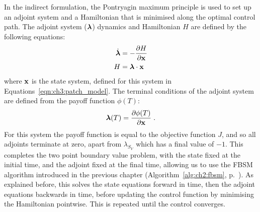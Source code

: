 In the indirect formulation, the Pontryagin maximum principle is used to set up an adjoint system and a Hamiltonian that is minimised along the optimal control path. The adjoint system ($\mathbf{\bm{\lambda}}$) dynamics and Hamiltonian $H$ are defined by the following equations:
\begin{subequations}\label{eqn:ch3:adjoint_hamiltonian}
    \begin{align}
        \dot{\mathbf{\bm{\lambda}}} &= -\frac{\partial{}H}{\partial\mathbf{\bm{x}}} \label{eqn:ch3:adjoint_hamiltonian_a}\\
        H &= \mathbf{\bm{\lambda}}\cdot\mathbf{\bm{x}} \label{eqn:ch3:adjoint_hamiltonian_b}
    \end{align}
\end{subequations}
where $\mathbf{\bm{x}}$ is the state system, defined for this system in Equations~\ref{eqn:ch3:patch_model}. The terminal conditions of the adjoint system are defined from the payoff function $\phi(T)$:
\begin{equation}
    \mathbf{\bm{\lambda}}(T) = \frac{\partial\phi(T)}{\partial\mathbf{\bm{x}}}\;.
\end{equation}
For this system the payoff function is equal to the objective function $J$, and so all adjoints terminate at zero, apart from $\lambda_{S_V}$ which has a final value of $-1$. This completes the two point boundary value problem, with the state fixed at the initial time, and the adjoint fixed at the final time, allowing us to use the FBSM algorithm introduced in the previous chapter (Algorithm~\ref{alg:ch2:fbsm}, p.~\pageref{alg:ch2:fbsm}). As explained before, this solves the state equations forward in time, then the adjoint equations backwards in time, before updating the control function by minimising the Hamiltonian pointwise. This is repeated until the control converges.

